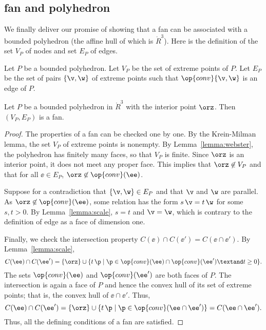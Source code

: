 \subsection{fan and polyhedron}

We finally deliver our promise of showing that a fan can be associated with
a bounded polyhedron (the affine hull of which is $\ring{R}^3$).  Here is the definition
of the set $V_P$ of nodes and set $E_P$ of edges.

\begin{definition}[$V_P,E_P$]
Let $P$ be a bounded polyhedron.  Let
$V_P$ be the set of extreme points of $P$.  Let $E_P$ be the set of pairs
$\{\v,\w\}$ of extreme points such that $\op{conv}\{\v,\w\}$ is an edge of
$P$.
\end{definition}
%
%

\begin{lemma}\label{lemma:polyhedron}%
Let $P$ be a bounded polyhedron in $\ring{R}^3$ with the interior
point $\orz$.  Then $(V_P,E_P)$ is a fan.
\end{lemma}
%

\begin{proof} The properties of a fan can be checked one by one.  By
the Krein-Milman lemma, the set $V_P$ of extreme points is nonempty.  By
Lemma~\ref{lemma:webster}, the polyhedron has finitely many faces, so that
$V_P$ is finite.  Since $\orz$ is an interior point, it does not
meet any proper face.  This implies that $\orz\not\in V_P$ and that
for all $\ee\in E_P$, $\orz\not\in \op{conv}(\ee)$.

Suppose for a contradiction that $\{\v,\w\}\in E_P$ and that $\v$
and $\w$ are parallel.  As $\orz\not\in \op{conv}(\ee)$, some
relation has the form $s\, \v = t\, \w$ for some $s, t>0$.  By
Lemma~\ref{lemma:scale}, $s=t$ and $\v=\w$, which is contrary to the
definition of edge as a face of dimension one.

Finally, we check the intersection property $C(\ee)\cap C(\ee') = C(\ee \cap
\ee')$.  By Lemma~\ref{lemma:scale},
\[ 
C(\ee) \cap C(\ee') =
 \{\orz\}\cup \{t\, \p \mid \p\in \op{conv}(\ee) \cap \op{conv}(\ee') 
\textand  t \ge 0\}.
\] 
The sets $\op{conv}(\ee)$ and $\op{conv}(\ee')$ are both faces of $P$.  The
intersection is again a face of $P$ and hence the convex
hull of its set of extreme points; that is, the convex hull of $\ee \cap \ee'$.
Thus,
\[ 
C(\ee)\cap C(\ee') = \{\orz\}\cup \{t\, \p \mid \p\in 
\op{conv}(\ee\cap \ee')\} = C(\ee \cap \ee').
\] 
Thus, all the defining conditions of a fan are satisfied.
\end{proof}

